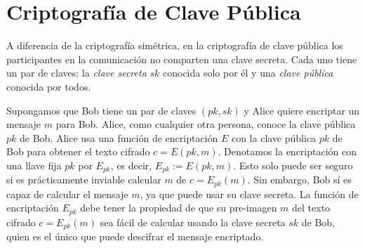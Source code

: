 \section{Criptografía de Clave Pública}

A diferencia de la criptografía simétrica, en la criptografía de clave pública los participantes en la comunicación no comparten una clave secreta. Cada uno tiene un par de claves: la \emph{clave secreta} $sk$ conocida solo por él y una \emph{clave pública} conocida por todos.

Supongamos que Bob tiene un par de claves $(pk, sk)$ y Alice quiere encriptar un mensaje $m$ para Bob. Alice, como cualquier otra persona, conoce la clave pública $pk$ de Bob. Alice usa una función de encriptación $E$ con la clave pública $pk$ de Bob para obtener el texto cifrado $c = E(pk, m)$. Denotamos la encriptación con una llave fija $pk$ por $E_{pk}$, es decir, $E_{pk} := E(pk, m)$. Esto solo puede ser seguro si es prácticamente inviable calcular $m$ de $c = E_{pk}(m)$. Sin embargo, Bob sí es capaz de calcular el mensaje $m$, ya que puede usar su clave secreta. La función de encriptación $E_{pk}$ debe tener la propiedad de que su pre-imagen $m$ del texto cifrado $c = E_{pk}(m)$ sea fácil de calcular usando la clave secreta $sk$ de Bob, quien es el único que puede descifrar el mensaje encriptado.

